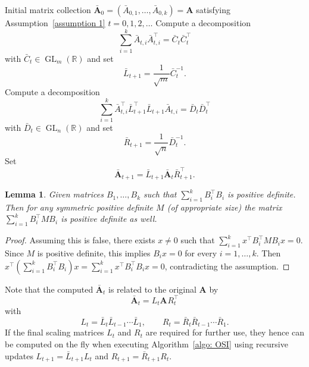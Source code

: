 \documentclass[a4paper]{article}
\newcommand{\R}{\mathbb{R}}
\newcommand{\bA}{\mathbf{A}}
\DeclareMathOperator{\GL}{GL}
\newtheorem{lemma}[theorem]{Lemma}
\theoremstyle{definition}
\numberwithin{equation}{section}
\begin{document}
\begin{algorithm}[t]
\small
\caption{Operator Sinkhorn Iteration (OSI)}
\label{algo: OSI}
\begin{algorithmic}[1]
\Input
Initial matrix collection $\bar{\bA}_0 = (\bar A_{0,1},\dots,\bar A_{0,k}) = \bA$ satisfying Assumption~\ref{assumption 1}
\For
{$t = 0,1,2,\dots$}
    \State
    Compute a decomposition
    \[
    \sum_{i=1}^k \bar A_{t,i}^{} \bar A_{t,i}^\top = \bar C_t^{} \bar C_t^\top
    \]
    with $\bar C_t \in \GL_m(\R)$ and set
    \[
    \bar L_{t+1} = \frac{1}{\sqrt{m}} \bar C_t^{-1}.
    \]
    \State
    Compute a decomposition
    \[
    \sum_{i=1}^k \bar A_{t,i}^{\top} \bar L_{t+1}^\top \bar L_{t+1}^{} \bar A_{t,i}^{} = \bar D_t \bar D_t^{\top}
    \]
    with $\bar D_t \in \GL_n(\R)$ and set
    \[
    \bar R_{t+1} = \frac{1}{\sqrt{n}} \bar D_t^{-1}.
    \]
    \State 
    Set
    \[
    \bar{\bA}_{t+1} = \bar L_{t+1}^{} \bar{\bA}_t^{} \bar R_{t+1}^\top.
    \]
\EndFor
\end{algorithmic}
\end{algorithm}

\begin{lemma}\label{lem: assumption 1}
Given matrices $B_1,\dots,B_k$ such that $\sum_{i=1}^k B_i^\top B_i$ is positive definite. Then for any symmetric positive definite $M$ (of appropriate size) the matrix $\sum_{i=1}^k B_i^\top M B_i$ is positive definite  as well.
\end{lemma}

\begin{proof}
Assuming this is false, there exists $x \neq 0$ such that $\sum_{i=1}^k x^\top B_i^\top M B_i x = 0$. Since $M$ is positive definite,  this implies $B_i x = 0$ for every $i = 1,\dots,k$. Then $x^\top \left( \sum_{i=1}^k B_i^\top B_i \right) x = \sum_{i=1}^k x^\top B_i^\top B_i x = 0$, contradicting the assumption.
\end{proof}

Note that the computed $\bar{\bA}_t$ is related to the original $\bA$ by
\[
 \bar{\bA}_{t}^{} = L_t^{} \bA^{} R_t^\top
\]
with
\begin{equation}\label{eq: formula Lt Rt}
 L_t = \bar L_t \bar L_{t-1} \cdots \bar L_1, \qquad R_t = \bar R_t \bar R_{t-1} \cdots \bar R_1.
\end{equation}
If the final scaling matrices $L_t$ and $R_t$ are required for further use, they hence can be computed on the fly when executing Algorithm~\ref{algo: OSI} using recursive updates $L_{t+1} = \bar L_{t+1} L_t$ and $R_{t+1} = \bar R_{t+1} R_t$.
\end{document}
